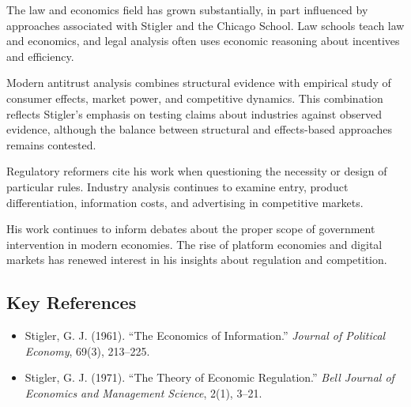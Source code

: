 The law and economics field has grown substantially, in part influenced by
approaches associated with Stigler and the Chicago School. Law schools teach
law and economics, and legal analysis often uses economic reasoning about
incentives and efficiency.

Modern antitrust analysis combines structural evidence with empirical study of
consumer effects, market power, and competitive dynamics. This combination
reflects Stigler's emphasis on testing claims about industries against
observed evidence, although the balance between structural and effects-based
approaches remains contested.

Regulatory reformers cite his work when questioning the necessity or design of
particular rules. Industry analysis continues to examine entry, product
differentiation, information costs, and advertising in competitive markets.

His work continues to inform debates about the proper scope of government
intervention in modern economies. The rise of platform economies and
digital markets has renewed interest in his insights about regulation
and competition.

\subsection*{Key References}
\begin{itemize}
    \item Stigler, G. J. (1961). ``The Economics of Information.'' \textit{Journal of Political Economy}, 69(3), 213--225.
    \item Stigler, G. J. (1971). ``The Theory of Economic Regulation.'' \textit{Bell Journal of Economics and Management Science}, 2(1), 3--21.
\end{itemize}
